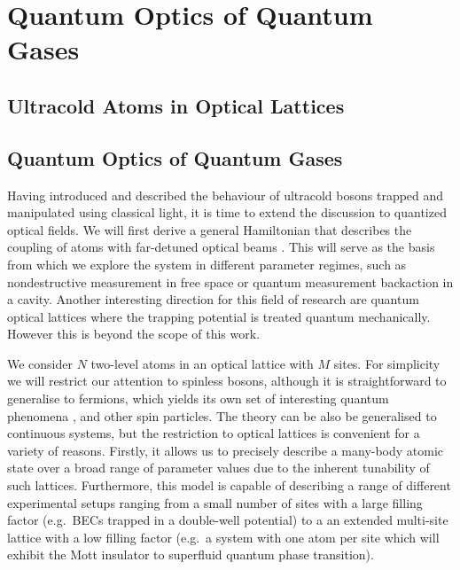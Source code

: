 
\chapter{Quantum Optics of Quantum Gases}  

\ifpdf
    \graphicspath{{Chapter2/Figs/Raster/}{Chapter2/Figs/PDF/}{Chapter2/Figs/}}
\else
    \graphicspath{{Chapter2/Figs/Vector/}{Chapter2/Figs/}}
\fi



\section{Ultracold Atoms in Optical Lattices}


\section{Quantum Optics of Quantum Gases}

Having introduced and described the behaviour of ultracold bosons
trapped and manipulated using classical light, it is time to extend
the discussion to quantized optical fields. We will first derive a
general Hamiltonian that describes the coupling of atoms with
far-detuned optical beams \cite{mekhov2012}. This will serve as the
basis from which we explore the system in different parameter regimes,
such as nondestructive measurement in free space or quantum
measurement backaction in a cavity. Another interesting direction for
this field of research are quantum optical lattices where the trapping
potential is treated quantum mechanically. However this is beyond the
scope of this work.

We consider $N$ two-level atoms in an optical lattice with $M$
sites. For simplicity we will restrict our attention to spinless
bosons, although it is straightforward to generalise to fermions,
which yields its own set of interesting quantum phenomena
\cite{atoms2015, mazzucchi2016, mazzucchi2016af}, and other spin
particles. The theory can be also be generalised to continuous
systems, but the restriction to optical lattices is convenient for a
variety of reasons. Firstly, it allows us to precisely describe a
many-body atomic state over a broad range of parameter values due to
the inherent tunability of such lattices. Furthermore, this model is
capable of describing a range of different experimental setups ranging
from a small number of sites with a large filling factor (e.g.~BECs
trapped in a double-well potential) to a an extended multi-site
lattice with a low filling factor (e.g.~a system with one atom per
site which will exhibit the Mott insulator to superfluid quantum phase
transition). 

